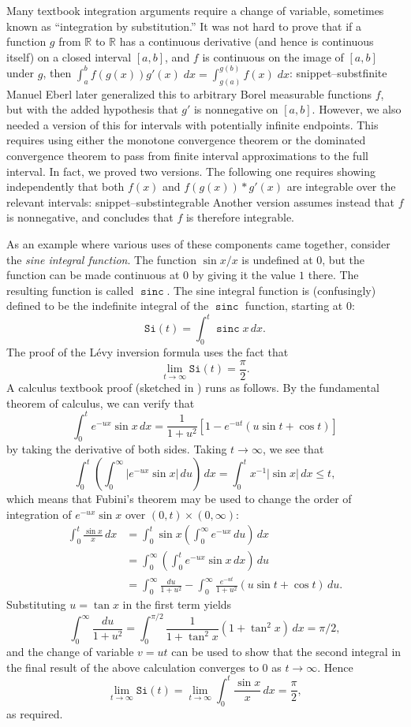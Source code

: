 \documentclass{svjour3}
\newcommand{\RR}{\mathbb{R}}
\newcommand{\fn}[1]{\mathtt{#1}} %
\newcommand{\sinc}{\mathop{\fn{sinc}}\nolimits}
\newcommand{\Snippet}[1]{\csname snippet--#1\endcsname}
\begin{document}
Many textbook integration arguments require a change of variable, sometimes known as ``integration by substitution.'' It was not hard to prove that if a function $g$ from $\RR$ to $\RR$ has a continuous derivative (and hence is continuous itself) on a closed interval $[a,b]$, and $f$ is continuous on the image of $[a, b]$ under $g$, then $\int_a^b f(g(x)) g'(x) \; dx = \int_{g(a)}^{g(b)} f(x) \; dx$:
\Snippet{substfinite}
Manuel Eberl later generalized this to arbitrary Borel measurable functions $f$, but with the added hypothesis that $g'$ is nonnegative on $[a, b]$. However, we also needed a version of this for intervals with potentially infinite endpoints. This requires using either the monotone convergence theorem or the dominated convergence theorem to pass from finite interval approximations to the full interval. In fact, we proved two versions. The following one requires showing independently that both $f(x)$ and $f(g(x)) * g'(x)$ are integrable over the relevant intervals:
\Snippet{substintegrable}
Another version assumes instead that $f$ is nonnegative, and concludes that $f$ is therefore integrable.

As an example where various uses of these components came together, consider the \emph{sine integral function}. The function $\sin x / x$ is undefined at $0$, but the function can be made continuous at $0$ by giving it the value $1$ there. The resulting function is called $\sinc$. The sine integral function is (confusingly) defined to be the indefinite integral of the $\sinc$ function, starting at $0$:
\[ 
\fn{Si}(t) = \int_0^t \sinc x \, dx. 
\]
The proof of the L\'evy inversion formula uses the fact that 
\[ 
\lim_{t \rightarrow \infty} \fn{Si}(t) = \frac{\pi}{2}.
\]
A calculus textbook proof (sketched in \cite[Example 18.4]{billingsley:95}) runs as follows. By the fundamental theorem of calculus, we can verify that
\[ 
\int_0^t e^{-ux} \sin x \, dx = \frac{1}{1+u^2}[1 - e^{-ut}(u \sin t + \cos t)] 
\]
by taking the derivative of both sides.  Taking $t \rightarrow \infty$, we see that
\[ 
\int_0^t \left( \int_0^\infty |e^{-ux} \sin x| \, du\right) \, dx = \int_0^t x^{-1} |\sin x| \, dx \le t,
\]
which means that Fubini's theorem may be used to change the order of integration of $e^{-ux} \sin x$ over $(0,t) \times (0, \infty)$:
\begin{align*}
\int_0^t \frac{\sin x}{x} \, dx &= \int_0^t \sin x \left(\int_0^\infty e^{-ux} \, du\right) \, dx \\
                                &= \int_0^\infty \left(\int_0^t e^{-ux} \sin x \, dx\right) \, du \\
                                &= \int_0^\infty \frac{du}{1+u^2} - \int_0^\infty \frac{e^{-ut}}{1+u^2} (u \sin t + \cos t) \, du.
\end{align*}
Substituting $u = \tan x$ in the first term yields
\[
 \int_0^\infty \frac{du}{1+u^2} = \int_0^{\pi/2} \frac{1}{1 + \tan^2 x} (1 + \tan^2 x) \, dx = \pi/2,
\]
and the change of variable $v = ut$ can be used to show that the second integral in the final result of the above calculation converges to $0$ as $t \rightarrow \infty$. Hence
\[ 
\lim_{t \rightarrow \infty} \fn{Si}(t) = \lim_{t \rightarrow \infty} \int_0^t \frac{\sin x}{x} \, dx = \frac{\pi}{2},
\]
as required. 
\end{document}
